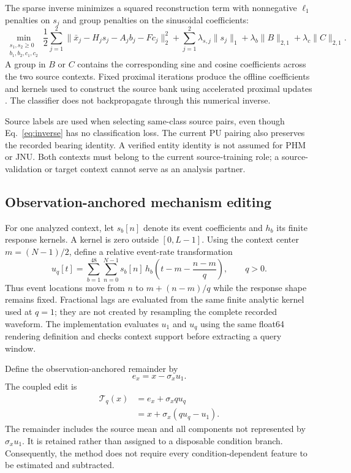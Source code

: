 The sparse inverse minimizes a squared reconstruction term with
nonnegative $\ell_1$ penalties on $s_j$ and group penalties on the sinusoidal
coefficients:
\begin{equation}
 \min_{\substack{s_1,s_2\geq0\\b_1,b_2,c_1,c_2}}
 \frac12\sum_{j=1}^{2}
 \|\bar x_j-H_js_j-A_jb_j-Fc_j\|_2^2
 +\sum_{j=1}^{2}\lambda_{s,j}\|s_j\|_1
 +\lambda_b\|B\|_{2,1}
 +\lambda_c\|C\|_{2,1}.
 \label{eq:inverse}
\end{equation}
A group in $B$ or $C$ contains the corresponding sine and cosine
coefficients across the two source contexts. Fixed proximal iterations
produce the offline coefficients and kernels used to construct the source
bank using accelerated proximal updates \cite{fista}. The classifier does not
backpropagate through this numerical inverse.

Source labels are used when selecting same-class source pairs, even though
Eq.~\eqref{eq:inverse} has no classification loss. The current PU pairing
also preserves the recorded bearing identity. A verified entity identity
is not assumed for PHM or JNU. Both contexts must belong to the current
source-training role; a source-validation or target context cannot serve
as an analysis partner.

\subsection{Observation-anchored mechanism editing}
For one analyzed context, let $s_b[n]$ denote its event coefficients and
$h_b$ its finite response kernels. A kernel is zero outside $[0,L-1]$.
Using the context center $m=(N-1)/2$, define a relative event-rate
transformation
\begin{equation}
 u_q[t]=\sum_{b=1}^{48}\sum_{n=0}^{N-1}
 s_b[n]\,
 h_b\!\left(t-m-\frac{n-m}{q}\right),\qquad q>0.
 \label{eq:render}
\end{equation}
Thus event locations move from $n$ to $m+(n-m)/q$ while the response
shape remains fixed. Fractional lags are evaluated from the same finite
analytic kernel used at $q=1$; they are not created by resampling the
complete recorded waveform. The implementation evaluates $u_1$ and
$u_q$ using the same float64 rendering definition and checks context support
before extracting a query window.

Define the observation-anchored remainder by
\begin{equation}
 e_x=x-\sigma_xu_1 .
 \label{eq:remainder}
\end{equation}
The coupled edit is
\begin{align}
 \mathcal T_q(x)
   &=e_x+\sigma_xq u_q \nonumber\\
   &=x+\sigma_x(q u_q-u_1).
 \label{eq:edit}
\end{align}
The remainder includes the source mean and all components not represented
by $\sigma_xu_1$. It is retained rather than assigned to a disposable
condition branch. Consequently, the method does not require every
condition-dependent feature to be estimated and subtracted.

